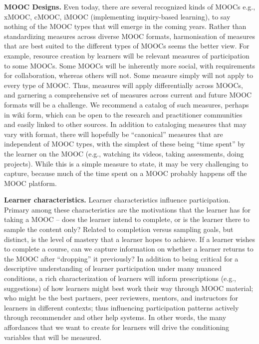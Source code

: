 \textbf{MOOC Designs.} Even today, there are several recognized kinds of MOOCs
e.g., xMOOC, cMOOC, iMOOC (implementing inquiry-based learning), to say nothing of the MOOC types that
will emerge in the coming years.  Rather than standardizing measures
across diverse MOOC formats, harmonisation of measures that are best
suited to the different types of MOOCs seems the better view. For
example, resource creation by learners will be relevant measures of
participation to some MOOCs. Some MOOCs will be inherently more social,
with requirements for collaboration, whereas others will not. Some
measure simply will not apply to every type of MOOC. Thus, measures will
apply differentially across MOOCs, and garnering a comprehensive set of
measures across current and future MOOC formats will be a challenge. We
recommend a catalog of such measures, perhaps in wiki form, which can be
open to the research and practitioner communities and easily linked to
other sources.  In addition to cataloging measures that may vary with
format, there will hopefully be ``canonical'' measures that are
independent of MOOC types, with the simplest of these being ``time spent''
by the learner on the MOOC (e.g., watching its videos, taking
assessments, doing projects). While this is a simple measure to state,
it may be very challenging to capture, because much of the time spent on
a MOOC probably happens off the MOOC platform.  

\textbf{Learner characteristics.} Learner characteristics influence
participation. Primary among these characteristics are the motivations
that the learner has for taking a MOOC -- does the learner intend to
complete, or is the learner there to sample the content only? Related to
completion versus sampling goals, but distinct, is the level of mastery
that a learner hopes to achieve. If a learner wishes to complete a
course, can we capture information on whether a learner returns to the
MOOC after ``dropping'' it previously?  In addition to being critical for
a descriptive understanding of learner participation under many nuanced
conditions, a rich characterization of learners will inform
prescriptions (e.g., suggestions) of how learners might best work their
way through MOOC material; who might be the best partners, peer
reviewers, mentors, and instructors for learners in different contexts;
thus influencing participation patterns actively through recommender and
other help systems. In other words, the many affordances that we want to
create for learners will drive the conditioning variables that will be
measured.  

